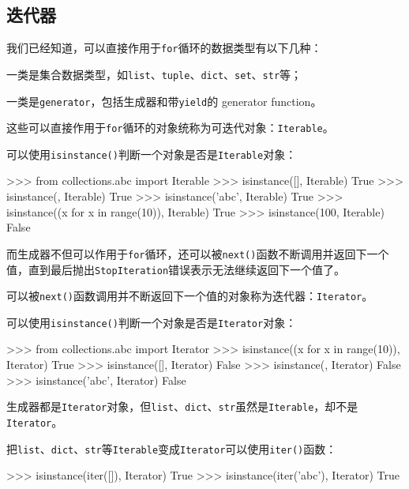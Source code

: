 \hypertarget{ux8fedux4ee3ux5668}{%
\subsection{迭代器}\label{ux8fedux4ee3ux5668}}

我们已经知道，可以直接作用于\texttt{for}循环的数据类型有以下几种：

一类是集合数据类型，如\texttt{list}、\texttt{tuple}、\texttt{dict}、\texttt{set}、\texttt{str}等；

一类是\texttt{generator}，包括生成器和带\texttt{yield}的 generator
function。

这些可以直接作用于\texttt{for}循环的对象统称为可迭代对象：\texttt{Iterable}。

可以使用\texttt{isinstance()}判断一个对象是否是\texttt{Iterable}对象：

\begin{pythoncode}
>>> from collections.abc import Iterable
>>> isinstance([], Iterable)
True
>>> isinstance({}, Iterable)
True
>>> isinstance('abc', Iterable)
True
>>> isinstance((x for x in range(10)), Iterable)
True
>>> isinstance(100, Iterable)
False
\end{pythoncode}

而生成器不但可以作用于\texttt{for}循环，还可以被\texttt{next()}函数不断调用并返回下一个值，直到最后抛出\texttt{StopIteration}错误表示无法继续返回下一个值了。

可以被\texttt{next()}函数调用并不断返回下一个值的对象称为迭代器：\texttt{Iterator}。

可以使用\texttt{isinstance()}判断一个对象是否是\texttt{Iterator}对象：

\begin{pythoncode}
>>> from collections.abc import Iterator
>>> isinstance((x for x in range(10)), Iterator)
True
>>> isinstance([], Iterator)
False
>>> isinstance({}, Iterator)
False
>>> isinstance('abc', Iterator)
False
\end{pythoncode}

生成器都是\texttt{Iterator}对象，但\texttt{list}、\texttt{dict}、\texttt{str}虽然是\texttt{Iterable}，却不是\texttt{Iterator}。

把\texttt{list}、\texttt{dict}、\texttt{str}等\texttt{Iterable}变成\texttt{Iterator}可以使用\texttt{iter()}函数：

\begin{pythoncode}
>>> isinstance(iter([]), Iterator)
True
>>> isinstance(iter('abc'), Iterator)
True
\end{pythoncode}

